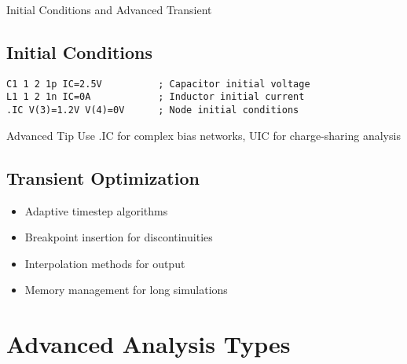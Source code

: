 \documentclass{beamer}
\begin{document}
\begin{frame}{Initial Conditions and Advanced Transient}
    \subsection{Initial Conditions}
    \begin{lstlisting}
C1 1 2 1p IC=2.5V          ; Capacitor initial voltage
L1 1 2 1n IC=0A            ; Inductor initial current
.IC V(3)=1.2V V(4)=0V      ; Node initial conditions
    \end{lstlisting}
    
    \begin{alertblock}{Advanced Tip}
        Use .IC for complex bias networks, UIC for charge-sharing analysis
    \end{alertblock}
    
    \subsection{Transient Optimization}
    \begin{itemize}
        \item Adaptive timestep algorithms
        \item Breakpoint insertion for discontinuities
        \item Interpolation methods for output
        \item Memory management for long simulations
    \end{itemize}
\end{frame}

\section{Advanced Analysis Types}
\end{document}
